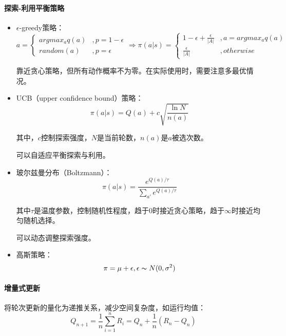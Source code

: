 \documentclass[
12pt, %
a4paper, 
oneside, %
headinclude,footinclude, %
]{scrartcl}
\begin{document}
\paragraph{探索-利用平衡策略}
\begin{itemize}
\item $ \epsilon $-greedy策略：
$$
a = 
\begin{cases} 
argmax_a q(a) &, p = 1 - \epsilon \\
random(a) &, p = \epsilon
\end{cases}
\Rightarrow 
\pi(a|s) = 
\begin{cases} 
1 - \epsilon + \frac{\epsilon}{|A|} &, a = argmax_a q(a) \\
\frac{\epsilon}{|A|} &, otherwise
\end{cases}
$$

靠近贪心策略，但所有动作概率不为零。在实际使用时，需要注意多最优情况。
\item UCB（upper confidence bound）策略：
$$ \pi(a|s) = Q(a) + c\sqrt{\frac{\ln N}{n(a)}} $$

其中，$ c $控制探索强度，$ N $是当前轮数，$ n(a) $是$ a $被选次数。

可以自适应平衡探索与利用。
\item 玻尔兹曼分布（Boltzmann）：
$$ \pi(a|s) = \frac{e^{Q(a)/\tau}}{\sum_{a'} e^{Q(a)/\tau}} $$

其中$ \tau $是温度参数，控制随机性程度，趋于$ 0 $时接近贪心策略，趋于$ \infty $时接近均匀随机选择。

可以动态调整探索强度。
\item 高斯策略：
$$ \pi = \mu + \epsilon, \epsilon \thicksim N(0, \sigma^2) $$
\end{itemize}
\paragraph{增量式更新}
将轮次更新的量化为递推关系，减少空间复杂度，如运行均值：
$$ Q_{n + 1} = \frac{1}{n}\sum_{i = 1}^n R_i = Q_n + \frac{1}{n}(R_n - Q_n) $$
\end{document}
